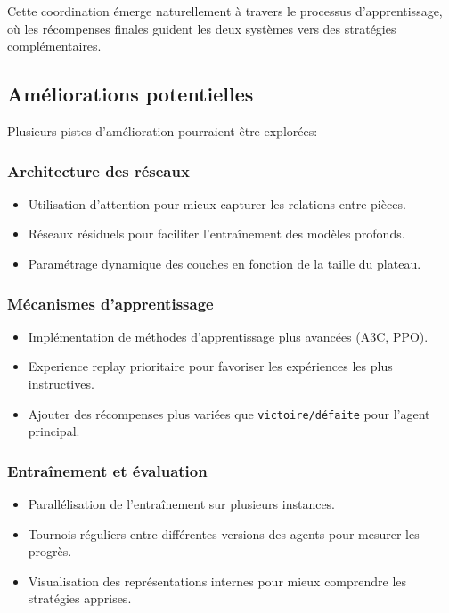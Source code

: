 \documentclass[]{article}
\begin{document}
Cette coordination émerge naturellement à travers le processus d'apprentissage, où les récompenses finales guident les deux systèmes vers des stratégies complémentaires.

\subsection{Améliorations potentielles}
Plusieurs pistes d'amélioration pourraient être explorées:

\subsubsection{Architecture des réseaux}
\begin{itemize}
    \item Utilisation d'attention pour mieux capturer les relations entre pièces.
    \item Réseaux résiduels pour faciliter l'entraînement des modèles profonds.
    \item Paramétrage dynamique des couches en fonction de la taille du plateau.
\end{itemize}

\subsubsection{Mécanismes d'apprentissage}
\begin{itemize}
    \item Implémentation de méthodes d'apprentissage plus avancées (A3C, PPO).
    \item Experience replay prioritaire pour favoriser les expériences les plus instructives.
    \item Ajouter des récompenses plus variées que \texttt{victoire/défaite} pour l'agent principal.
\end{itemize}

\subsubsection{Entraînement et évaluation}
\begin{itemize}
    \item Parallélisation de l'entraînement sur plusieurs instances.
    \item Tournois réguliers entre différentes versions des agents pour mesurer les progrès.
    \item Visualisation des représentations internes pour mieux comprendre les stratégies apprises.
\end{itemize}
\end{document}
